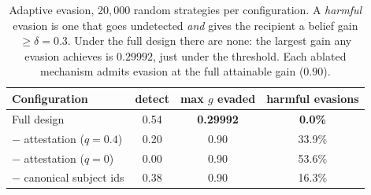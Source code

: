 \documentclass[sigconf,anonymous,review]{acmart}
\theoremstyle{acmplain}
\begin{document}
\begin{table}[t]\centering\small
\begin{tabular}{lccc}
\toprule
Configuration & detect & max $g$ evaded & harmful evasions \\
\midrule
Full design & 0.54 & \textbf{0.29992} & \textbf{0.0\%} \\
$-$ attestation ($q{=}0.4$) & 0.20 & 0.90 & 33.9\% \\
$-$ attestation ($q{=}0$) & 0.00 & 0.90 & 53.6\% \\
$-$ canonical subject ids & 0.38 & 0.90 & 16.3\% \\
\bottomrule
\end{tabular}
\caption{Adaptive evasion, $20{,}000$ random strategies per configuration. A
\emph{harmful} evasion is one that goes undetected \emph{and} gives the recipient
a belief gain $\geq\delta{=}0.3$. Under the full design there are none: the
largest gain any evasion achieves is $0.29992$, just under the threshold. Each
ablated mechanism admits evasion at the full attainable gain ($0.90$).}
\label{tab:evasion}
\end{table}
\end{document}
